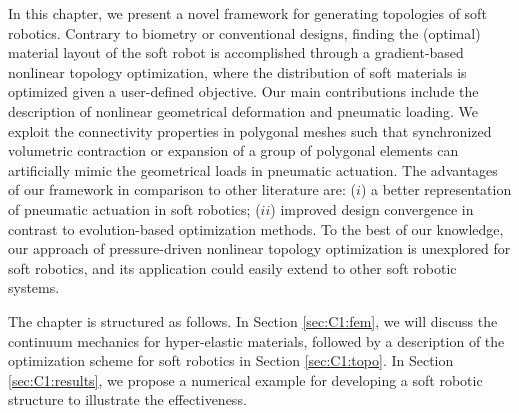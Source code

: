 In this chapter, we present a novel framework for generating topologies of soft robotics. Contrary to biometry or conventional designs, finding the (optimal) material layout of the soft robot is accomplished through a gradient-based nonlinear topology optimization, where the distribution of soft materials is optimized given a user-defined objective. Our main contributions include the description of nonlinear geometrical deformation and pneumatic loading. We exploit the connectivity properties in polygonal meshes such that synchronized volumetric contraction or expansion of a group of polygonal elements can artificially mimic the geometrical loads in pneumatic actuation. The advantages of our framework in comparison to other literature are: ($i$) a better representation of pneumatic actuation in soft robotics; ($ii$) improved design convergence in contrast to evolution-based optimization methods. To the best of our knowledge, our approach of pressure-driven nonlinear topology optimization is unexplored for soft robotics, and its application could easily extend to other soft robotic systems.

The chapter is structured as follows. In Section \ref{sec:C1:fem}, we will discuss the continuum mechanics for hyper-elastic materials, followed by a description of the optimization scheme for soft robotics in Section \ref{sec:C1:topo}. In Section \ref{sec:C1:results}, we propose a numerical example for developing a soft robotic structure to illustrate the effectiveness.
